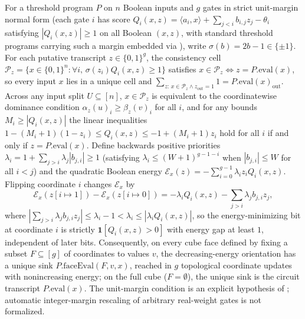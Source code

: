 \begin{result}
For a threshold program $P$ on $n$ Boolean inputs and $g$ gates in strict
unit-margin normal form (each gate $i$ has score
$Q_i(x,z)=\langle a_i,x\rangle+\sum_{j<i}b_{i,j}z_j-\theta_i$ satisfying
$|Q_i(x,z)|\ge 1$ on all Boolean $(x,z)$, with standard threshold programs
carrying such a margin embedded via ), write
$\sigma(b)=2b-1\in\{\pm 1\}$. For each putative transcript $z\in\{0,1\}^g$, the
consistency cell $\mathcal P_z=\{x\in\{0,1\}^n:\forall i,\,\sigma(z_i)Q_i(x,z)\ge 1\}$
satisfies $x\in\mathcal P_z\iff z=P.\mathrm{eval}(x)$, so every input $x$ lies
in a unique cell and $\sum_{z:\,x\in\mathcal P_z\wedge z_{\mathrm{out}}=1}1=P.\mathrm{eval}(x)_{\mathrm{out}}$.
Across any input split $U\subseteq[n]$, $x\in\mathcal P_z$ is equivalent to the
coordinatewise dominance condition $\alpha_z(u)_i\ge\beta_z(v)_i$ for all $i$,
and for any bounds $M_i\ge|Q_i(x,z)|$ the linear inequalities
$1-(M_i+1)(1-z_i)\le Q_i(x,z)\le -1+(M_i+1)z_i$ hold for all $i$ if and only if
$z=P.\mathrm{eval}(x)$.
Define backwards positive priorities $\lambda_i=1+\sum_{j>i}\lambda_j|b_{j,i}|\ge 1$
(satisfying $\lambda_i\le(W+1)^{g-1-i}$ when $|b_{j,i}|\le W$ for all $i<j$) and
the quadratic Boolean energy $\mathcal E_x(z)=-\sum_{i=0}^{g-1}\lambda_i z_i Q_i(x,z)$.
Flipping coordinate $i$ changes $\mathcal E_x$ by
\[
\mathcal E_x(z[i\mapsto 1])-\mathcal E_x(z[i\mapsto 0])
 = -\lambda_i Q_i(x,z)-\sum_{j>i}\lambda_j b_{j,i}z_j,
\]
where $|\sum_{j>i}\lambda_j b_{j,i}z_j|\le\lambda_i-1<\lambda_i\le|\lambda_i Q_i(x,z)|$,
so the energy-minimizing bit at coordinate $i$ is strictly $\mathbf 1[Q_i(x,z)>0]$
with energy gap at least $1$, independent of later bits. Consequently, on every
cube face defined by fixing a subset $F\subseteq[g]$ of coordinates to values
$v$, the decreasing-energy orientation has a unique sink
$P.\mathrm{faceEval}(F,v,x)$, reached in $g$ topological coordinate updates with
nonincreasing energy; on the full cube ($F=\emptyset$), the unique sink is the
circuit transcript $P.\mathrm{eval}(x)$. The unit-margin condition is an
explicit hypothesis of ; automatic integer-margin
rescaling of arbitrary real-weight gates is not formalized.\citep{ThresholdCircuitRepresentations2026}

\end{result}
